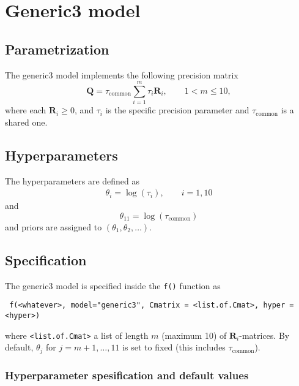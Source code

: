 \documentclass[a4paper,11pt]{article}
\def\mm#1{\ensuremath{\boldsymbol{#1}}} %
\begin{document}
\section*{Generic3 model}

\subsection*{Parametrization}

The generic3 model implements the following precision matrix
\begin{equation}\label{eq1}%
    \mathbf{Q}= \tau_{\text{common}} \sum_{i=1}^{m} \tau_i \mm{R}_i,
    \qquad 1 < m \le 10,
\end{equation}
where each $\mm{R}_i \ge 0$, and $\tau_i$ is the specific precision
parameter and $\tau_{\text{common}}$ is a shared one.

\subsection*{Hyperparameters}

The hyperparameters are defined as 
\begin{eqnarray*}
    \theta_i = \log(\tau_i), \qquad i=1, 10
\end{eqnarray*}
and
\begin{displaymath}
    \theta_{11} = \log(\tau_{\text{common}})
\end{displaymath}
and priors are assigned to $(\theta_1,\theta_2, \ldots)$.

\subsection*{Specification}

The generic3 model is specified inside the {\tt f()} function as
\begin{verbatim}
 f(<whatever>, model="generic3", Cmatrix = <list.of.Cmat>, hyper = <hyper>)
\end{verbatim}
where {\tt <list.of.Cmat>} a list of length $m$ (maximum 10) of
$\mm{R}_i$-matrices. By default, $\theta_j$ for $j=m+1, \ldots, 11$ is
set to fixed (this includes $\tau_{\text{common}}$).


\subsubsection*{Hyperparameter spesification and default values}

\end{document}
